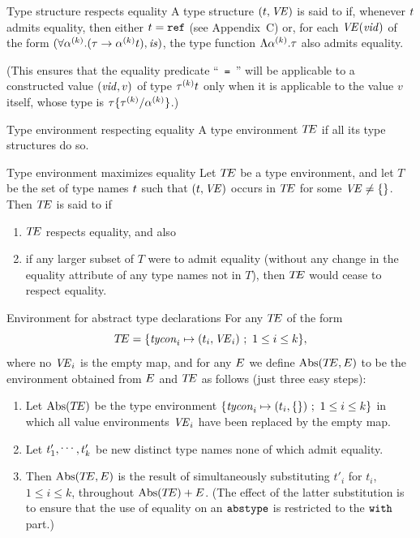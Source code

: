\begin{definition}{Type structure respects equality}
A type structure $(t,\textit{V\kern-.05emE\/})$ is said to  if,
whenever $t$ admits equality, then either $t=\mbox{\tt ref}$ (see
Appendix~C) or, for each $\textit{V\kern-.05emE\/}(\textit{vid\/})$ of the form
$(\forall\mbox{$\alpha^{(k)}$}.(\tau\rightarrow\mbox{$\alpha^{(k)}$}t), \textit{is\/})$,
the type function $\Lambda\mbox{$\alpha^{(k)}$}.\tau$ also admits equality.

(This ensures that the equality predicate ``~{\tt =}~'' will be applicable
to a constructed value $(\textit{vid\/},v)$ of type $\mbox{$\tau^{(k)}$}t$ only when it is
applicable to the value $v$ itself, whose type is
$\tau\{\mbox{$\tau^{(k)}$}/\mbox{$\alpha^{(k)}$}\}$.)
\end{definition}

\begin{definition}{Type environment respecting equality}
A type environment $\mbox{$T\!E$}$  if all its type
structures do so.
\end{definition}

\begin{definition}{Type environment maximizes equality}
Let $\mbox{$T\!E$}$ be a type environment, and let $T$ be the set of type names
$t$ such that $(t,\textit{V\kern-.05emE\/})$ occurs in $\mbox{$T\!E$}$ for some $\textit{V\kern-.05emE\/}\neq\{\}$.
Then $\mbox{$T\!E$}$ is said to  if
\begin{enumerate}
\item $\mbox{$T\!E$}$ respects equality, and also
\item if any larger subset of $T$ were to admit equality (without any
  change in the equality attribute of any type names not in $T$), then
  $\mbox{$T\!E$}$ would cease to respect equality.
\end{enumerate}
\end{definition}

\begin{definition}{Environment for abstract type declarations}
For any $\mbox{$T\!E$}$ of the form
\begin{equation*}
\mbox{$T\!E$}=\{\textit{tycon\/}_{i}\mapsto(t_{i},\textit{V\kern-.05emE\/}_{i})\ ;\ 1\leq i\leq k\},
\end{equation*}
where no $\textit{V\kern-.05emE\/}_{i}$ is the empty map, and for any $E$ we define
$\mathop{\rm Abs}\nolimits(\mbox{$T\!E$},E)$ to be the environment obtained from 
$E$ and $\mbox{$T\!E$}$ as follows (just three easy steps):
\begin{enumerate}
\item Let $\mathop{\rm Abs}\nolimits(\mbox{$T\!E$})$ be the type environment
$\{\textit{tycon\/}_{i}\mapsto(t_{i},\{\})\ ;\ 1\leq i\leq k\}$
in which all value environments $\textit{V\kern-.05emE\/}_{i}$ have been replaced by the empty map. 
\item Let $t'_{1},\mathinner{{}^{\textstyle .\,.\,.}},t'_{k}$ be new distinct type names none of which
admit equality.
\item Then $\mathop{\rm Abs}\nolimits(\mbox{$T\!E$},E)$ is the result of simultaneously
substituting
$t'_{i}$ for $t_{i}$, $1\leq i\leq k$,  throughout $\mathop{\rm Abs}\nolimits(\mbox{$T\!E$})+E$. 
(The effect of the latter substitution is to ensure that the use of 
equality on  an ${\tt abstype}$ is restricted to the ${\tt with}$ part.)
\end{enumerate}
\end{definition}

